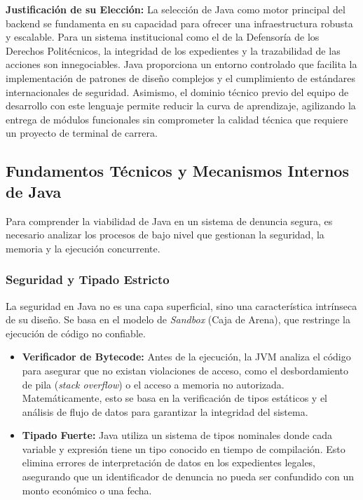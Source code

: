 \textbf{Justificación de su Elección:}
La selección de Java como motor principal del backend se fundamenta en su capacidad para ofrecer una infraestructura robusta y escalable. Para un sistema institucional como el de la Defensoría de los Derechos Politécnicos, la integridad de los expedientes y la trazabilidad de las acciones son innegociables. Java proporciona un entorno controlado que facilita la implementación de patrones de diseño complejos y el cumplimiento de estándares internacionales de seguridad. Asimismo, el dominio técnico previo del equipo de desarrollo con este lenguaje permite reducir la curva de aprendizaje, agilizando la entrega de módulos funcionales sin comprometer la calidad técnica que requiere un proyecto de terminal de carrera.

\subsection{Fundamentos Técnicos y Mecanismos Internos de Java}

Para comprender la viabilidad de Java en un sistema de denuncia segura, es necesario analizar los procesos de bajo nivel que gestionan la seguridad, la memoria y la ejecución concurrente.

\subsubsection{Seguridad y Tipado Estricto}
La seguridad en Java no es una capa superficial, sino una característica intrínseca de su diseño. Se basa en el modelo de \textit{Sandbox} (Caja de Arena), que restringe la ejecución de código no confiable.
\begin{itemize}
    \item \textbf{Verificador de Bytecode:} Antes de la ejecución, la JVM analiza el código para asegurar que no existan violaciones de acceso, como el desbordamiento de pila (\textit{stack overflow}) o el acceso a memoria no autorizada. Matemáticamente, esto se basa en la verificación de tipos estáticos y el análisis de flujo de datos para garantizar la integridad del sistema.
    \item \textbf{Tipado Fuerte:} Java utiliza un sistema de tipos nominales donde cada variable y expresión tiene un tipo conocido en tiempo de compilación. Esto elimina errores de interpretación de datos en los expedientes legales, asegurando que un identificador de denuncia no pueda ser confundido con un monto económico o una fecha.
\end{itemize}

